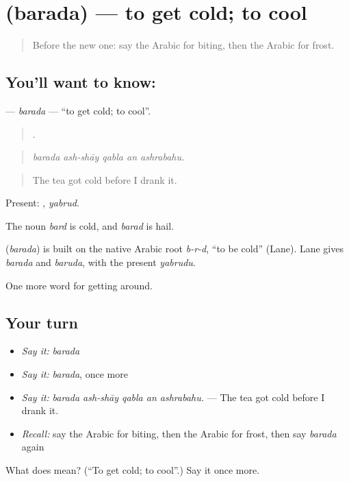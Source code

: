 \section[\texorpdfstring{\ar{برد} (barada)}{برد (barada)}]{ (barada) — to get cold; to cool}

\label{lesson:AR-C483-barada}



\begin{quote}
Before the new one: say the Arabic for biting, then the Arabic for frost.
\end{quote}

\subsection*{You'll want to know: }
\textbf{} — \emph{barada} — \textquotedblleft{}to get cold; to cool\textquotedblright{}.

\begin{quote}
    .
\end{quote}

\begin{quote}
\emph{barada ash-shāy qabla an ashrabahu.}
\end{quote}

\begin{quote}
The tea got cold before I drank it.
\end{quote}

Present: , \emph{yabrud}.

The noun \emph{bard} is cold, and \emph{barad} is hail.

\begin{cousinweb}
\textbf{} (\emph{barada}) is built on the native Arabic root \emph{b-r-d}, \textquotedblleft{}to be cold\textquotedblright{} (Lane). Lane gives \emph{barada} and \emph{baruda}, with the present \emph{yabrudu}.
\end{cousinweb}

\begin{grammarlens}[title={What you've built}]
One more word for getting around.
\end{grammarlens}

\subsection*{Your turn}
\begin{itemize}
\raggedright
  \item \emph{Say it:} \emph{barada}
  \item \emph{Say it:} \emph{barada}, once more
  \item \emph{Say it:} \emph{barada ash-shāy qabla an ashrabahu.} — The tea got cold before I drank it.
  \item \emph{Recall:} say the Arabic for biting, then the Arabic for frost, then say \emph{barada} again
\end{itemize}

\begin{tcolorbox}[breakable,colback=teal!4,colframe=teal!35!black,title={Before you move on}]
What does  mean? (\textquotedblleft{}To get cold; to cool\textquotedblright{}.) Say it once more.
\end{tcolorbox}
